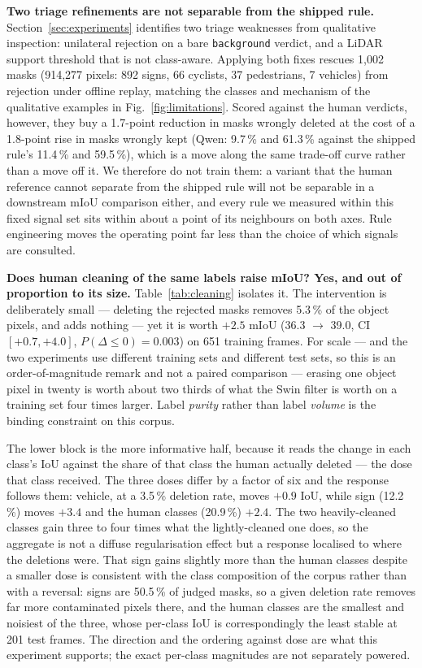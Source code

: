 \documentclass[conference]{IEEEtran}
\begin{document}


\textbf{Two triage refinements are not separable from the shipped rule.}
Section~\ref{sec:experiments} identifies two triage weaknesses from qualitative inspection: unilateral
rejection on a bare \texttt{background} verdict, and a LiDAR support threshold that is not class-aware.
Applying both fixes rescues 1{,}002 masks (914{,}277 pixels: 892 signs, 66 cyclists, 37 pedestrians,
7 vehicles) from rejection under offline replay, matching the classes and mechanism of the qualitative
examples in Fig.~\ref{fig:limitations}. Scored against the human verdicts, however, they buy a
1.7-point reduction in masks wrongly deleted at the cost of a 1.8-point rise in masks wrongly kept
(Qwen: 9.7\,\% and 61.3\,\% against the shipped rule's 11.4\,\% and 59.5\,\%), which is a move along
the same trade-off curve rather than a move off it.
We therefore do not train them: a variant that the human reference cannot separate from the shipped
rule will not be separable in a downstream mIoU comparison either, and every rule we measured within
this fixed signal set sits within about a point of its neighbours on both axes. Rule engineering moves
the operating point far less than the choice of which signals are consulted.



\textbf{Does human cleaning of the same labels raise mIoU? Yes, and out of proportion to its size.}
Table~\ref{tab:cleaning} isolates it. The intervention is deliberately small --- deleting the rejected
masks removes 5.3\,\% of the object pixels, and adds nothing --- yet it is worth $+2.5$ mIoU
(36.3 $\to$ 39.0, CI $[+0.7, +4.0]$, $P(\Delta\leq0)=0.003$) on 651 training frames. For scale --- and
the two experiments use different training sets and different test sets, so this is an order-of-magnitude
remark and not a paired comparison --- erasing one object pixel in twenty is worth about two thirds of
what the Swin filter is worth on a training set four times larger. Label \emph{purity} rather than
label \emph{volume} is the binding constraint on this corpus.

The lower block is the more informative half, because it reads the change in each class's IoU against
the share of that class the human actually deleted --- the dose that class received. The three doses
differ by a factor of six and the response follows them: vehicle, at a 3.5\,\% deletion rate, moves
$+0.9$ IoU, while sign (12.2\,\%) moves $+3.4$ and the human classes (20.9\,\%) $+2.4$. The two
heavily-cleaned classes gain three to four times what the lightly-cleaned one does, so the aggregate is
not a diffuse regularisation effect but a response localised to where the deletions were. That sign
gains slightly more than the human classes despite a smaller dose is consistent with the class
composition of the corpus rather than with a reversal: signs are 50.5\,\% of judged masks, so a given
deletion rate removes far more contaminated pixels there, and the human classes are the smallest and
noisiest of the three, whose per-class IoU is correspondingly the least stable at 201 test frames.
The direction and the ordering against dose are what this experiment supports; the exact per-class
magnitudes are not separately powered.
\end{document}
